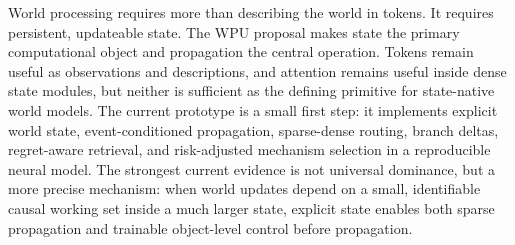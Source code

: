 \documentclass[11pt]{article}
\begin{document}
World processing requires more than describing the world in tokens. It requires
persistent, updateable state. The WPU proposal makes state the primary
computational object and propagation the central operation. Tokens remain useful
as observations and descriptions, and attention remains useful inside dense
state modules, but neither is sufficient as the defining primitive for
state-native world models. The current prototype is a small first step: it
implements explicit world state, event-conditioned propagation, sparse-dense
routing, branch deltas, regret-aware retrieval, and risk-adjusted mechanism
selection in a reproducible neural model. The strongest current evidence is not
universal dominance, but a more precise mechanism: when world updates depend on
a small, identifiable causal working set inside a much larger state, explicit
state enables both sparse propagation and trainable object-level control before
propagation.
\end{document}
